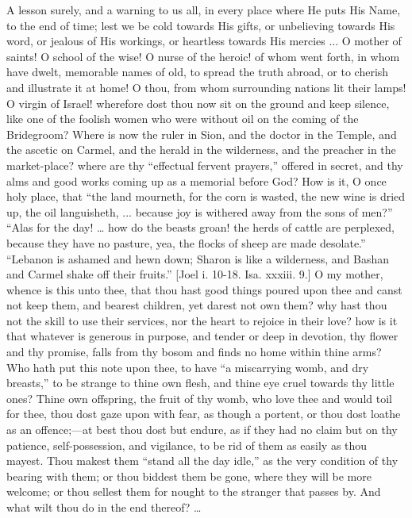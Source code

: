 A lesson surely, and a warning to us all, in every place where He
puts His Name, to the end of time; lest we be cold towards His gifts,
or unbelieving towards His word, or jealous of His workings, or
heartless towards His mercies ... O mother of saints! O school of the
wise! O nurse of the heroic! of whom went forth, in whom have dwelt,
memorable names of old, to spread the truth abroad, or to cherish and
illustrate it at home! O thou, from whom surrounding nations lit their
lamps! O virgin of Israel! wherefore dost thou now sit on the ground
and keep silence, like one of the foolish women who were without oil
on the coming of the Bridegroom? Where is now the ruler in Sion, and
the doctor in the Temple, and the ascetic on Carmel, and the herald in
the wilderness, and the preacher in the market-place? where are thy
``effectual fervent prayers,'' offered in secret, and thy alms
and good works coming up as a memorial before God? How is it, O once
holy place, that ``the land mourneth, for the corn is wasted, the
new wine is dried up, the oil languisheth, ... because joy is withered
away from the sons of men?'' ``Alas for the day! … how do
the beasts groan! the herds of cattle are perplexed, because they have
no pasture, yea, the flocks of sheep are made desolate.''
``Lebanon is ashamed and hewn down; Sharon is like a wilderness,
and Bashan and Carmel shake off their fruits.'' [Joel i. 10-18. Isa.
xxxiii. 9.] O my mother, whence is this unto thee, that thou hast good
things poured upon thee and canst not keep them, and bearest children,
yet darest not own them? why hast thou not the skill to use their
services, nor the heart to rejoice in their love? how is it that
whatever is generous in purpose, and tender or deep in devotion, thy
flower and thy promise, falls from thy bosom and finds no home within
thine arms? Who hath put this note upon thee, to have ``a
miscarrying womb, and dry breasts,'' to be strange to thine own
flesh, and thine eye cruel towards thy little ones? Thine own
offspring, the fruit of thy womb, who love thee and would toil for
thee, thou dost gaze upon with fear, as though a portent, or thou dost
loathe as an offence;—at best thou dost but endure, as if they had no
claim but on thy patience, self-possession, and vigilance, to be rid
of them as easily as thou mayest. Thou makest them ``stand all the
day idle,'' as the very condition of thy bearing with them; or
thou biddest them be gone, where they will be more welcome; or thou
sellest them for nought to the stranger that passes by. And what wilt
thou do in the end thereof? …

